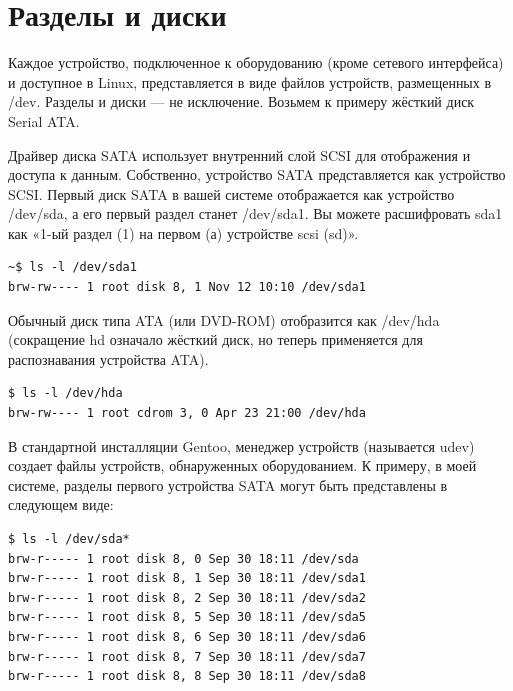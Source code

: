 \documentclass[10pt]{book}
\begin{document}
\section{Разделы и диски}

Каждое устройство, подключенное к оборудованию (кроме сетевого интерфейса) и доступное в Linux, представляется в виде файлов устройств, размещенных в /dev. Разделы и диски — не исключение. Возьмем к примеру жёсткий диск Serial ATA.

Драйвер диска SATA использует внутренний слой SCSI для отображения и доступа к данным. Собственно, устройство SATA представляется как устройство SCSI. Первый диск SATA в вашей системе отображается как устройство /dev/sda, а его первый раздел станет /dev/sda1. Вы можете расшифровать sda1 как «1-ый раздел (1) на первом (а) устройстве scsi (sd)».

\vspace{3mm}
\begin{tcolorbox}
\begin{lstlisting}
~$ ls -l /dev/sda1
brw-rw---- 1 root disk 8, 1 Nov 12 10:10 /dev/sda1
\end{lstlisting}
\end{tcolorbox}

Обычный диск типа ATA (или DVD-ROM) отобразится как /dev/hda (сокращение hd означало жёсткий диск, но теперь применяется для распознавания устройства ATA).

\vspace{3mm}
\begin{tcolorbox}
\begin{lstlisting}
$ ls -l /dev/hda
brw-rw---- 1 root cdrom 3, 0 Apr 23 21:00 /dev/hda
\end{lstlisting}
\end{tcolorbox}

В стандартной инсталляции Gentoo, менеджер устройств (называется udev) создает файлы устройств, обнаруженных оборудованием. К примеру, в моей системе, разделы первого устройства SATA могут быть представлены в следующем виде:

\vspace{3mm}
\begin{tcolorbox}
\begin{lstlisting}
$ ls -l /dev/sda*
brw-r----- 1 root disk 8, 0 Sep 30 18:11 /dev/sda
brw-r----- 1 root disk 8, 1 Sep 30 18:11 /dev/sda1 
brw-r----- 1 root disk 8, 2 Sep 30 18:11 /dev/sda2
brw-r----- 1 root disk 8, 5 Sep 30 18:11 /dev/sda5 
brw-r----- 1 root disk 8, 6 Sep 30 18:11 /dev/sda6 
brw-r----- 1 root disk 8, 7 Sep 30 18:11 /dev/sda7 
brw-r----- 1 root disk 8, 8 Sep 30 18:11 /dev/sda8
\end{lstlisting}
\end{tcolorbox}
\end{document}
